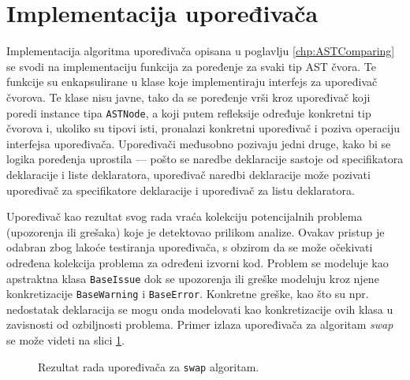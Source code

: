 \section{Implementacija upoređivača}
\label{sec:ImplementationComparer}

Implementacija algoritma upoređivača opisana u poglavlju \ref{chp:ASTComparing} se svodi na implementaciju funkcija za poređenje za svaki tip AST čvora. Te funkcije su enkapsulirane u klase koje implementiraju interfejs za upoređivač čvorova. Te klase nisu javne, tako da se poređenje vrši kroz upoređivač koji poredi instance tipa \texttt{ASTNode}, a koji putem refleksije određuje konkretni tip čvorova i, ukoliko su tipovi isti, pronalazi konkretni upoređivač i poziva operaciju interfejsa upoređivača. Upoređivači međusobno pozivaju jedni druge, kako bi se logika poređenja uprostila --- pošto se naredbe deklaracije sastoje od specifikatora deklaracije i liste deklaratora, upoređivač naredbi deklaracije može pozivati upoređivač za specifikatore deklaracije i upoređivač za listu deklaratora. 

Upoređivač kao rezultat svog rada vraća kolekciju potencijalnih problema (upozorenja ili grešaka) koje je detektovao prilikom analize. Ovakav pristup je odabran zbog lakoće testiranja upoređivača, s obzirom da se može očekivati određena kolekcija problema za određeni izvorni kod. Problem se modeluje kao apstraktna klasa \texttt{BaseIssue} dok se upozorenja ili greške modeluju kroz njene konkretizacije \texttt{BaseWarning} i \texttt{BaseError}. Konkretne greške, kao što su npr. nedostatak deklaracija se mogu onda modelovati kao konkretizacije ovih klasa u zavisnosti od ozbiljnosti problema. Primer izlaza upoređivača za algoritam \emph{swap} se može videti na slici \ref{fig:ComparerSwap}.

\begin{figure}[h!]
\centering
\caption{Rezultat rada upoređivača za \texttt{swap} algoritam.}
\label{fig:ComparerSwap}
\end{figure}
